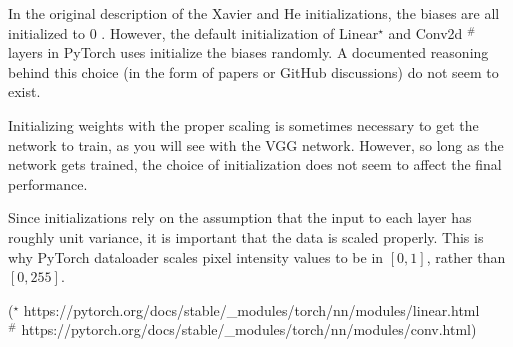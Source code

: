 \begin{concept}
    In the original description of the Xavier and He initializations, the biases are all initialized to 0 . However, the default initialization of Linear${ }^{\star}$ and Conv2d ${ }^{\#}$ layers in PyTorch uses initialize the biases randomly. A documented reasoning behind this choice (in the form of papers or GitHub discussions) do not seem to exist.

    Initializing weights with the proper scaling is sometimes necessary to get the network to train, as you will see with the VGG network. However, so long as the network gets trained, the choice of initialization does not seem to affect the final performance.

    Since initializations rely on the assumption that the input to each layer has roughly unit variance, it is important that the data is scaled properly. This is why PyTorch dataloader scales pixel intensity values to be in $[0,1]$, rather than $[0,255]$.

    (${ }^{\star}$ https://pytorch.org/docs/stable/_modules/torch/nn/modules/linear.html\\
    ${ }^{\#}$ https://pytorch.org/docs/stable/_modules/torch/nn/modules/conv.html)
\end{concept}

